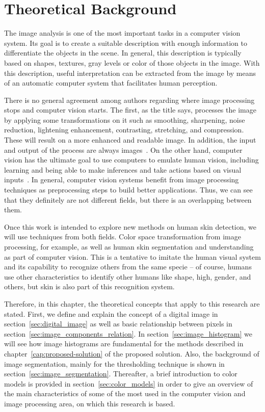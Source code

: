 \chapter{Theoretical Background}
\label{cap:conceitos}
The image analysis is one of the most important tasks in a computer vision system. Its goal is to create a suitable description with enough information to differentiate the objects in the scene. In general, this description is typically based on shapes, textures, gray levels or color of those objects in the image. With this description, useful interpretation can be extracted from the image by means of an automatic computer system that facilitates human perception.

There is no general agreement among authors regarding where image processing stops and computer vision starts. The first, as the title says, processes the image by applying some transformations on it such as smoothing, sharpening, noise reduction, lightening enhancement, contrasting, stretching, and compression. These will result on a more enhanced and readable image. In addition, the input and output of the process are always images~\citep{gonzalez:02}. On the other hand, computer vision has the ultimate goal to use computers to emulate human vision, including learning and being able to make inferences and take actions based on visual inputs~\citep{gonzalez:02}. In general, computer vision systems benefit from image processing techniques as preprocessing steps to build better applications. Thus, we can see that they definitely are not different fields, but there is an overlapping between them.

Once this work is intended to explore new methods on human skin detection, we will use techniques from both fields. Color space transformation from image processing, for example, as well as human skin segmentation and understanding as part of computer vision. This is a tentative to imitate the human visual system and its capability to recognize others from the same specie -- of course, humans use other characteristics to identify other humans like shape, high, gender, and others, but skin is also part of this recognition system.

Therefore, in this chapter, the theoretical concepts that apply to this research are stated. First, we define and explain the concept of a digital image in section~\ref{sec:digital_image} as well as basic relationship between pixels in section~\ref{sec:image_components_relation}. In section~\ref{sec:image_histogram} we will see how image histograms are fundamental for the methods described in chapter~\ref{cap:proposed-solution} of the proposed solution. Also, the background of image segmentation, mainly for the thresholding technique is shown in section~\ref{sec:image_segmentation}. Thereafter, a brief introduction to color models is provided in section~\ref{sec:color_models} in order to give an overview of the main characteristics of some of the most used in the computer vision and image processing area, on which this research is based.

